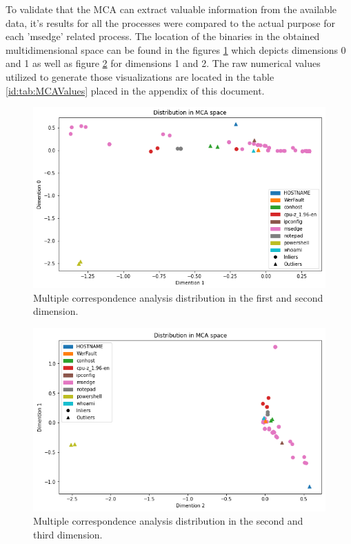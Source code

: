 \documentclass[a4paper,twoside,12pt]{book}
\begin{document}
To validate that the MCA can extract valuable information from the available data, it's results for all
the processes were compared to the actual purpose for each 'msedge' related process. The location of the
binaries in the obtained multidimensional space can be found in the figures \ref{fig:mca01} which 
depicts dimensions 0 and 1 as well as figure \ref{fig:mca12} for dimensions 1 and 2. The raw numerical 
values utilized to generate those visualizations are located in the table \ref{id:tab:MCAValues} placed 
in the appendix of this document. 


\begin{figure}
	\centering
	\includegraphics[scale=0.9]{images/MCA01}
	\caption{Multiple correspondence analysis distribution in the first and second dimension.}
	\label{fig:mca01}
 \end{figure}

 \begin{figure}
	\centering
	\includegraphics[scale=0.9]{images/MCA12}
	\caption{Multiple correspondence analysis distribution in the second and third dimension.}
	\label{fig:mca12}
 \end{figure}
\end{document}

